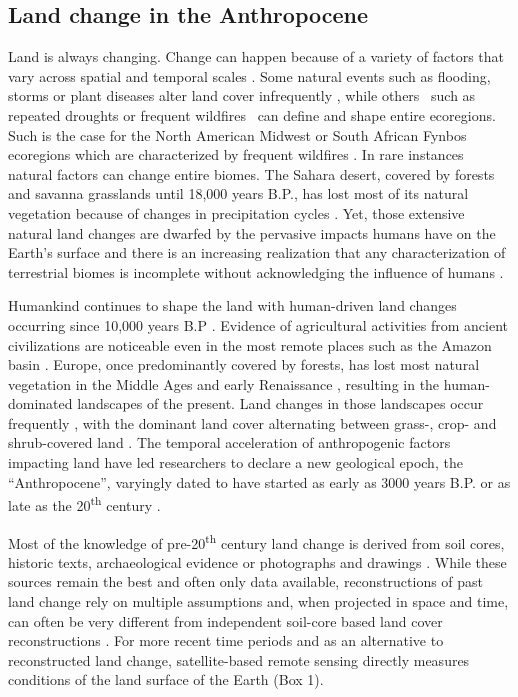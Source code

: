 \subsection{Land change in the Anthropocene}
\label{C01_0101}

Land is always changing. Change can happen because of a variety of factors that vary across spatial and temporal scales \citep{Lambin2003,Kennedy2014}. Some natural events such as flooding, storms or plant diseases alter land cover infrequently \citep{Turner1998}, while others \textendash\ such as repeated droughts or frequent wildfires \textendash\ can define and shape entire ecoregions. Such is the case for the North American Midwest or South African Fynbos ecoregions which are characterized by frequent wildfires \citep{Westerling2006,Kelly2017}. In rare instances natural factors can change entire biomes. The Sahara desert, covered by forests and savanna grasslands until 18,000 years B.P., has lost most of its natural vegetation because of changes in precipitation cycles \citep{Hamilton1981}. Yet, those extensive natural land changes are dwarfed by the pervasive impacts humans have on the Earth’s surface and there is an increasing realization that any characterization of terrestrial biomes is incomplete without acknowledging the influence of humans \citep{Ellis2008,Kehoe2017}.

Humankind continues to shape the land \citep{Ellis2011,Ellis2013} with human-driven land changes occurring since 10,000 years B.P \citep{Ellis2013}. Evidence of agricultural activities from ancient civilizations are noticeable even in the most remote places such as the Amazon basin \citep{McMichael2017}. Europe, once predominantly covered by forests, has lost most natural vegetation in the Middle Ages and early Renaissance \citep{Kaplan2009}, resulting in the human-dominated landscapes of the present. Land changes in those landscapes occur frequently \citep{Kleyer2007}, with the dominant land cover alternating between grass-, crop- and shrub-covered land \citep{Kleyer2007,Manning2009}. The temporal acceleration of anthropogenic factors impacting land \citep{Steffen2015} have led researchers to declare a new geological epoch, the “Anthropocene”, varyingly dated to have started as early as 3000 years B.P. or as late as the 20\textsuperscript{th} century \citep{Ellis2013a}. 

Most of the knowledge of pre-20\textsuperscript{th} century land change is derived from soil cores, historic texts, archaeological evidence or photographs and drawings \citep{KleinGoldewijk2011,KleinGoldewijk2016}. While these sources remain the best and often only data available, reconstructions of past land change rely on multiple assumptions \citep{KleinGoldewijk2013} and, when projected in space and time, can often be very different from independent soil-core based land cover reconstructions \citep{Kaplan2017}. For more recent time periods and as an alternative to reconstructed land change, satellite-based remote sensing directly measures conditions of the land surface of the Earth (Box 1).

